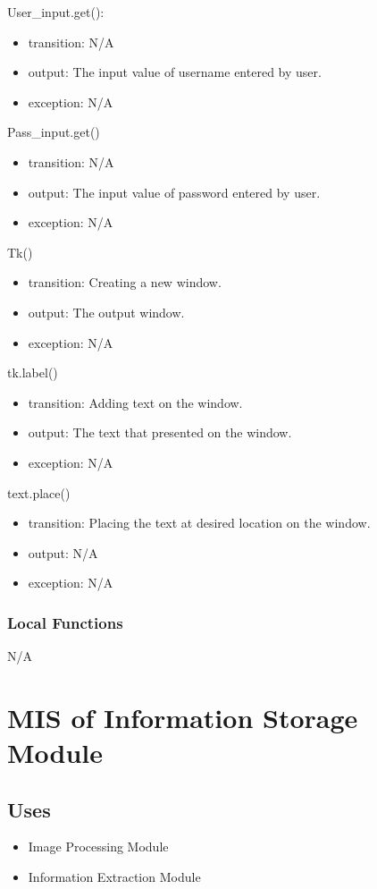 \documentclass[12pt, titlepage]{article}
\begin{document}
\noindent User\_input.get():
\begin{itemize} 
\item transition: N/A
\item output: The input value of username entered by user.
\item exception: N/A 
\end{itemize}
\noindent Pass\_input.get()
\begin{itemize} 
\item transition: N/A
\item output: The input value of password entered by user.
\item exception: N/A 
\end{itemize}
\noindent Tk()
\begin{itemize} 
\item transition: Creating a new window.
\item output: The output window.
\item exception: N/A 
\end{itemize}
\noindent tk.label()
\begin{itemize} 
\item transition: Adding text on the window.
\item output: The text that presented on the window.
\item exception: N/A 
\end{itemize}
\noindent text.place()
\begin{itemize} 
\item transition: Placing the text at desired location on the window.
\item output: N/A
\item exception: N/A 
\end{itemize}

\subsubsection{Local Functions}

N/A


\newpage



\section{MIS of Information Storage Module} 



\subsection{Uses}
\begin{itemize}
\item Image Processing Module
\item Information Extraction Module
\end{itemize}
\end{document}
